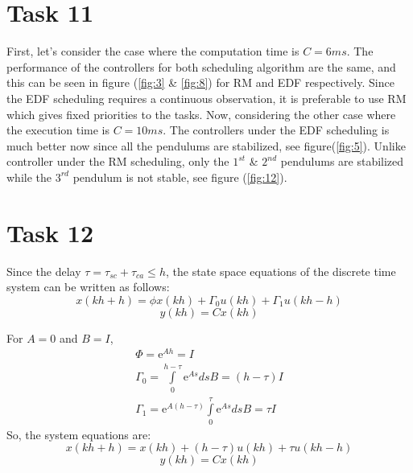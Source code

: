 \documentclass[a4paper,12pt,oneside,onecolumn]{article} %
\begin{document}

\section*{Task 11}
First, let's consider the case where the computation time is $C=6ms$. The performance of the controllers for both scheduling algorithm are the same, and this can be seen in figure (\ref{fig:3} \& \ref{fig:8}) for RM and EDF respectively. Since the EDF scheduling requires a continuous observation, it is preferable to use RM which gives fixed priorities to the tasks. Now, considering the other case where the execution time is $C=10ms$. The controllers under the EDF scheduling is much better now since all the pendulums are stabilized, see figure(\ref{fig:5}). Unlike controller under the RM scheduling, only the $1^{st}$ \& $2^{nd}$ pendulums are stabilized while the $3^{rd}$ pendulum is not stable, see figure (\ref{fig:12}).


\section*{Task 12}

Since the delay $\tau=\tau_{sc} + \tau_{ca} \leq h$, the state space equations of the discrete time system can be written as follows: 
\begin{equation}
x(kh+h)= \phi x(kh) + \Gamma_0 u(kh) + \Gamma_1 u(kh-h)
\end{equation}
\begin{equation}
y(kh)=Cx(kh)
\end{equation}

For $A=0$ and $B=I$, 
\begin{align*}
\Phi = \mathrm{e}^{Ah}= I
\\\Gamma_0=\int\limits_{0}^{h-\tau} \mathrm{e}^{As} ds B = (h-\tau)I
\\\Gamma_1=\mathrm{e}^{A(h-\tau)}\int\limits_{0}^{\tau} \mathrm{e}^{As} ds B = \tau I
\end{align*}
So, the system equations are: 
\begin{equation}
x(kh+h)= x(kh) + (h-\tau) u(kh) + \tau u(kh-h)
\label{eq:06}
\end{equation}
\begin{equation} 
y(kh)=Cx(kh) 
\end{equation}
\end{document}
